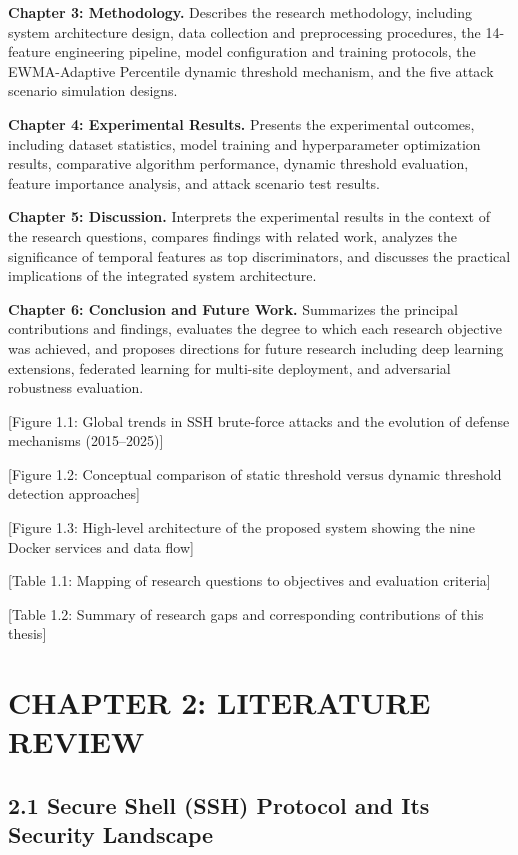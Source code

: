\documentclass[
  a4paper]{report}
\begin{document}
\textbf{Chapter 3: Methodology.} Describes the research methodology,
including system architecture design, data collection and preprocessing
procedures, the 14-feature engineering pipeline, model configuration and
training protocols, the EWMA-Adaptive Percentile dynamic threshold
mechanism, and the five attack scenario simulation designs.

\textbf{Chapter 4: Experimental Results.} Presents the experimental
outcomes, including dataset statistics, model training and
hyperparameter optimization results, comparative algorithm performance,
dynamic threshold evaluation, feature importance analysis, and attack
scenario test results.

\textbf{Chapter 5: Discussion.} Interprets the experimental results in
the context of the research questions, compares findings with related
work, analyzes the significance of temporal features as top
discriminators, and discusses the practical implications of the
integrated system architecture.

\textbf{Chapter 6: Conclusion and Future Work.} Summarizes the principal
contributions and findings, evaluates the degree to which each research
objective was achieved, and proposes directions for future research
including deep learning extensions, federated learning for multi-site
deployment, and adversarial robustness evaluation.

{[}Figure 1.1: Global trends in SSH brute-force attacks and the
evolution of defense mechanisms (2015--2025){]}

{[}Figure 1.2: Conceptual comparison of static threshold versus dynamic
threshold detection approaches{]}

{[}Figure 1.3: High-level architecture of the proposed system showing
the nine Docker services and data flow{]}

{[}Table 1.1: Mapping of research questions to objectives and evaluation
criteria{]}

{[}Table 1.2: Summary of research gaps and corresponding contributions
of this thesis{]}

\chapter{CHAPTER 2: LITERATURE
REVIEW}\label{chapter-2-literature-review}

\section{2.1 Secure Shell (SSH) Protocol and Its Security
Landscape}\label{secure-shell-ssh-protocol-and-its-security-landscape}
\end{document}
